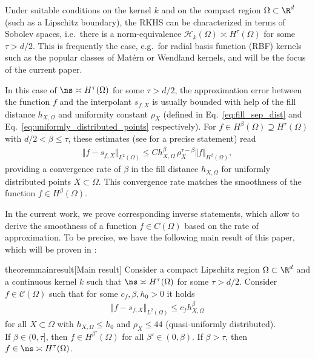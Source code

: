 \documentclass[a4paper, 10pt]{article}
\begin{document}
%
%
%
%
%

%
%
%
%
%
%
%
%
%
%
%
%
%
%
%
%
%
Under suitable conditions on the kernel $k$ and on the compact region $\Omega \subset \R^d$ (such as a Lipschitz boundary), 
the RKHS can be characterized in terms of Sobolev spaces, i.e.\ there is a norm-equivalence $\mathcal{H}_k(\Omega) \asymp H^\tau(\Omega)$ for some $\tau > d/2$.
This is frequently the case, e.g.\ for radial basis function (RBF) kernels such as the popular classes of Matérn or Wendland kernels,
and will be the focus of the current paper.

In this case of $\ns \asymp H^\tau(\Omega)$ for some $\tau > d/2$, 
the approximation error between the function $f$ and the interpolant $s_{f, X}$ is usually bounded with help of the fill distance $h_{X, \Omega}$ and uniformity constant $\rho_X$ (defined in Eq.~\eqref{eq:fill_sep_dist} and Eq.~\eqref{eq:uniformly_distributed_points} respectively).
For $f \in H^\beta(\Omega) \supseteq H^\tau(\Omega)$ with $d/2 < \beta \leq \tau$, 
these estimates (see  for a precise statement) read
\begin{align}
\label{eq:direct_statement}
\Vert f - s_{f,X} \Vert_{L^2(\Omega)} \leq C h_{X, \Omega}^\beta \, \rho_{X}^{\tau-\beta} \Vert f \Vert_{H^\beta(\Omega)},
\end{align}
providing a convergence rate of $\beta$ in the fill distance $h_{X, \Omega}$ for uniformly distributed points $X \subset \Omega$.
This convergence rate matches the smoothness of the function $f \in H^\beta(\Omega)$.

In the current work, we prove corresponding inverse statements, 
which allow to derive the smoothness of a function $f \in C(\Omega)$ based on the rate of approximation. 
To be precise, we have the following main result of this paper, which will be proven in :

\begin{restatable}{theorem}{mainresult}[Main result]
\label{th:inverse_statement_generalized}
Consider a compact Lipschitz region $\Omega \subset \R^d$ and a continuous kernel $k$ such that $\ns \asymp H^\tau(\Omega)$ for some $\tau > d/2$.
Consider $f \in \mathcal{C}(\Omega)$ such that for some $c_f, \beta, h_0 > 0$ it holds
\begin{align}
\label{eq:inverse_statement_assumption}
\Vert f - s_{f, X} \Vert_{L^2(\Omega)} \leq c_f h_{X, \Omega}^\beta
\end{align}
for all $X \subset \Omega$ with $h_{X, \Omega} \leq h_0$ and $\rho_X \leq 44$ (quasi-uniformly distributed). \\
If $\beta \in (0, \tau]$,
then $f \in H^{\beta'}(\Omega)$ for all $\beta' \in (0, \beta)$.
If $\beta > \tau$, then $f \in \ns \asymp H^\tau(\Omega)$. 
\end{restatable}
\end{document}
